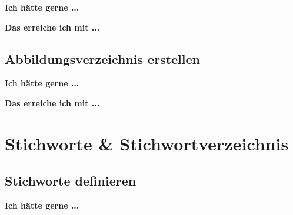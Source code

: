 \documentclass[twoside, 
               a4paper, 
               10pt, 
               parskip=full, 
               sectionentrydots=true, 
               listof=totoc, 
               listof=entryprefix,
               numbers=endperiod]{scrartcl}
\begin{document}
{\textbf {Ich hätte gerne ...}}
 



\newpage
{\textbf {Das erreiche ich mit ...}}
 
\begin{miniSeite}[colbacktitle=black!35!white,title=\LaTeX-Code]

\end{miniSeite}




\newpage
\subsection{Abbildungsverzeichnis erstellen}
{\textbf {Ich hätte gerne ...}}
 
\begin{miniSeite}[colbacktitle=black!35!white,title=Ausdruck]

\end{miniSeite}


\newpage
{\textbf {Das erreiche ich mit ...}}
 
\begin{miniSeite}[colbacktitle=black!35!white,title=\LaTeX-Code]

\end{miniSeite}





\newpage
\section{Stichworte \& Stichwortverzeichnis}
\subsection{Stichworte definieren}

{\textbf {Ich hätte gerne ...}}
 
\begin{miniSeite}[colbacktitle=black!35!white,title=Ausdruck]

\end{miniSeite}

\end{document}
